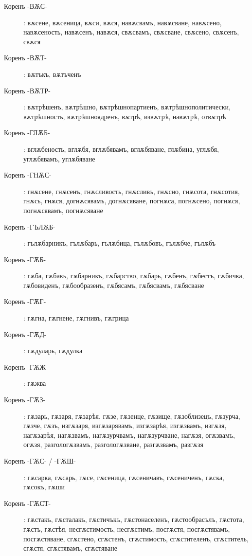 \documentclass{article}
\begin{document}
\begin{description}
		\item[Коренъ -ВѪС-]: вѫсене, вѫсеница, вѫси, вѫся, навѫсвамъ, навѫсване, навѫсено, навѫсеность, навѫсенъ, навѫся, свѫсвамъ, свѫсване, свѫсено, свѫсенъ, свѫся
		
	\item[Коренъ -ВѪТ-]: вѫтъкъ, вѫтъченъ
	
	\item[Коренъ -ВѪТР-]: вѫтрѣшенъ, вѫтрѣшно, вѫтрѣшнопартиенъ, вѫтрѣшнополитически, вѫтрѣшность, вѫтрѣшноядренъ, вѫтрѣ, извѫтрѣ, навѫтрѣ, отвѫтрѣ
	
	\item[Коренъ -ГЛѪБ-]: вглѫбеность, вглѫбя, вглѫбявамъ, вглѫбяване, глѫбина, углѫбя, углѫбявамъ, углѫбяване
	
	\item[Коренъ -ГНѪС-]: гнѫсене, гнѫсенъ, гнѫсливость, гнѫсливъ, гнѫсно, гнѫсота, гнѫсотия, гнѫсь, гнѫся, догнѫсявамъ, догнѫсяване, погнѫса, погнѫсено, погнѫся, погнѫсявамъ, погнѫсяване
	
	\item[Коренъ -ГЪЛѪБ-]: гълѫбарникъ, гълѫбарь, гълѫбица, гълѫбовъ, гълѫбче, гълѫбъ
	
	\item[Коренъ -ГѪБ-]: гѫба, гѫбавъ, гѫбарникъ, гѫбарство, гѫбарь, гѫбенъ, гѫбестъ, гѫбичка, гѫбовиденъ, гѫбообразенъ, гѫбясамъ, гѫбясвамъ, гѫбясване
	
	\item[Коренъ -ГѪГ-]: гѫгна, гѫгнене, гѫгнивъ, гѫгрица
	
	\item[Коренъ -ГѪД-]: гѫдуларь, гѫдулка
	
	\item[Коренъ -ГѪЖ-]: гѫжва
	
	\item[Коренъ -ГѪЗ-]: гѫзарь, гѫзаря, гѫзарѣя, гѫзе, гѫзенце, гѫзище, гѫзоблизецъ, гѫзурча, гѫзче, гѫзъ, изгѫзаря, изгѫзарявамъ, изгѫзарѣя, изгѫзвамъ, изгѫзя, нагѫзарѣя, нагѫзвамъ, нагѫзурчвамъ, нагѫзурчване, нагѫзя, огѫзвамъ, огѫзя, разгологѫзвамъ, разгологѫзване, разгѫзвамъ, разгѫзя
	
	\item[Коренъ -ГѪС- / -ГѪШ-]: гѫсарка, гѫсарь, гѫсе, гѫсеница, гѫсеничавъ, гѫсениченъ, гѫска, гѫсокъ, гѫши
	
	\item[Коренъ -ГѪСТ-]: гѫстакъ, гѫсталакъ, гѫстичъкъ, гѫстонаселенъ, гѫстообрасълъ, гѫстота, гѫстъ, гѫстѣя, несгѫстимость, несгѫстимъ, посгѫстя, посгѫстявамъ, посгѫстяване, сгѫстено, сгѫстенъ, сгѫстимость, сгѫстителенъ, сгѫститель, сгѫстя, сгѫстявамъ, сгѫстяване
	

\end{description}
\end{document}
